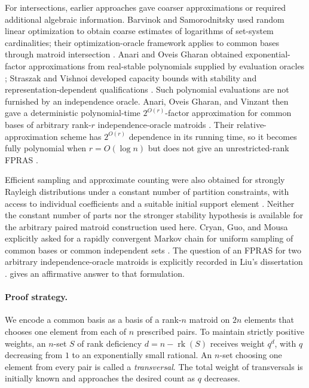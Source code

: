 \documentclass[11pt]{article}
\theoremstyle{definition}
\newcommand{\rank}{\operatorname{rk}}
\begin{document}
For intersections, earlier approaches gave coarser approximations or
required additional algebraic information.  Barvinok and Samorodnitsky
used random linear optimization to obtain coarse estimates of logarithms
of set-system cardinalities; their optimization-oracle framework applies
to common bases through matroid intersection
\cite[arXiv version~2, Sections~2.1--2.2 and Theorem~3.1]{BS2007}.
Anari and Oveis Gharan obtained exponential-factor
approximations from real-stable polynomials supplied by evaluation
oracles \cite{AO2017}; Straszak and Vishnoi developed capacity bounds
with stability and representation-dependent qualifications
\cite{SV2016}.  Such polynomial evaluations are not furnished by an
independence oracle.  Anari, Oveis Gharan, and Vinzant then gave a
deterministic polynomial-time $2^{O(r)}$-factor approximation for
common bases of arbitrary rank-$r$ independence-oracle matroids
\cite{AOV2021}.  Their relative-approximation scheme has
$2^{O(r)}$ dependence in its running time, so it becomes fully
polynomial when $r=O(\log n)$ but does not give an unrestricted-rank FPRAS
\cite[arXiv version~2, Theorem~1.3 and Corollary~1.4]{AOV2021}.

Efficient sampling and approximate counting were also obtained for
strongly Rayleigh distributions under a constant number of partition
constraints, with access to individual coefficients and a suitable
initial support element \cite[Section~1.3, version~3]{AASV2021}.
Neither the constant number of parts nor the stronger stability
hypothesis is available for the arbitrary paired matroid construction
used here.  Cryan, Guo, and Mousa explicitly asked for a rapidly
convergent Markov chain for uniform sampling of common bases or common
independent sets \cite[arXiv version~4, Introduction]{CGM2021}.
The question of an FPRAS for two arbitrary
independence-oracle matroids is explicitly recorded in Liu's dissertation
\cite[Section~13.2, Problem~1]{Liu2023}.
 gives an affirmative answer to that formulation.

\paragraph{Proof strategy.}
We encode a common basis as a basis of a rank-$n$ matroid on $2n$ elements
that chooses one element from each of $n$ prescribed pairs.  To maintain
strictly positive weights, an $n$-set $S$ of rank deficiency
$d=n-\rank(S)$ receives weight $q^d$, with $q$ decreasing from $1$ to
an exponentially small rational.
An $n$-set choosing one element from every pair is called a
\emph{transversal}.  The total weight of transversals is initially known
and approaches the desired count as $q$ decreases.
\end{document}
